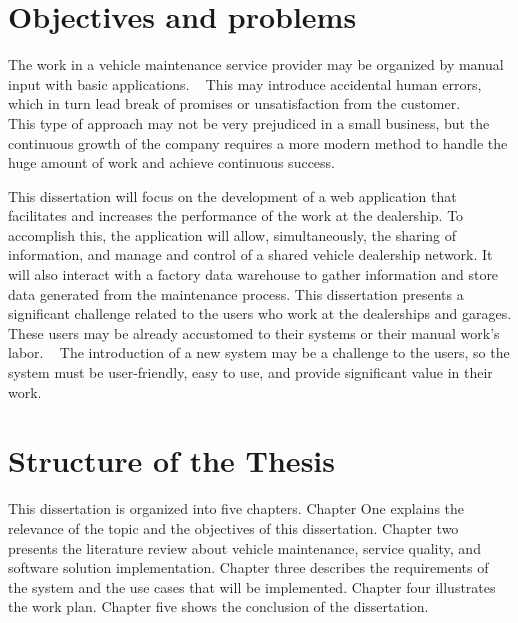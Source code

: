 \section{Objectives and problems}

The work in a vehicle maintenance service provider may be organized by manual input with basic applications. ~\cite{MAS_MOTORS} 
This may introduce accidental human errors, which in turn lead break of promises or unsatisfaction from the customer. ~\cite{MAS_MOTORS} ~\cite{Setting_the_after_sale_process}
This type of approach may not be very prejudiced in a small business, but the continuous growth of the company requires a more modern method to handle the huge amount of work and achieve continuous success. ~\cite{MAS_MOTORS}

This dissertation will focus on the development of a web application that facilitates and increases the performance of the work at the dealership.
To accomplish this, the application will allow, simultaneously,  the sharing of information, and manage and control of a shared vehicle dealership network.
It will also interact with a factory data warehouse to gather information and store data generated from the maintenance process. 
This dissertation presents a significant challenge related to the users who work at the dealerships and garages. 
These users may be already accustomed to their systems or their manual work's labor.  
The introduction of a new system may be a challenge to the users, so the system must be user-friendly, easy to use, and provide significant value in their work.

\section{Structure of the Thesis}

This dissertation is organized into five chapters. Chapter One explains the relevance of the topic and the objectives of this dissertation.
Chapter two presents the literature review about vehicle maintenance, service quality, and software solution implementation. 
Chapter three describes the requirements of the system and the use cases that will be implemented.
Chapter four illustrates the work plan.
Chapter five shows the conclusion of the dissertation. 


